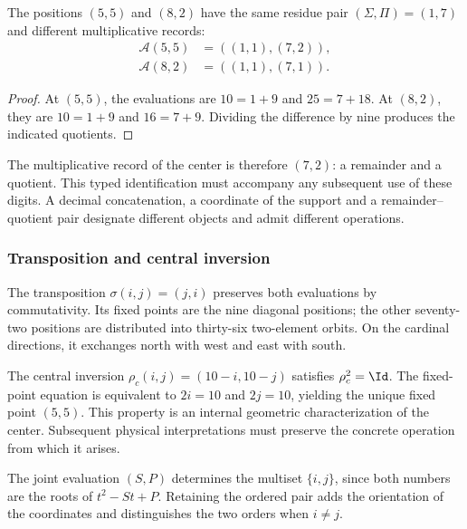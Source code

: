 



\begin{bloqueindivisible}
\begin{proposicion}
\label{prop:app-centro}
The positions $(5,5)$ and $(8,2)$ have the same residue pair $(\Sigma,\Pi)=(1,7)$ and different multiplicative records:
\begin{align}
 \mathcal A(5,5)&=((1,1),(7,2)),\\
 \mathcal A(8,2)&=((1,1),(7,1)).
\end{align}
\end{proposicion}

\begin{proof}
At $(5,5)$, the evaluations are $10=1+9$ and $25=7+18$. At $(8,2)$, they are $10=1+9$ and $16=7+9$. Dividing the difference by nine produces the indicated quotients.
\end{proof}
\end{bloqueindivisible}

The multiplicative record of the center is therefore $(7,2)$: a remainder and a quotient. This typed identification must accompany any subsequent use of these digits. A decimal concatenation, a coordinate of the support and a remainder--quotient pair designate different objects and admit different operations.

\subsubsection{Transposition and central inversion}

The transposition $\sigma(i,j)=(j,i)$ preserves both evaluations by commutativity. Its fixed points are the nine diagonal positions; the other seventy-two positions are distributed into thirty-six two-element orbits. On the cardinal directions, it exchanges north with west and east with south.

The central inversion $\rho_c(i,j)=(10-i,10-j)$ satisfies $\rho_c^2=\Id$. The fixed-point equation is equivalent to $2i=10$ and $2j=10$, yielding the unique fixed point $(5,5)$. This property is an internal geometric characterization of the center. Subsequent physical interpretations must preserve the concrete operation from which it arises.

The joint evaluation $(S,P)$ determines the multiset $\{i,j\}$, since both numbers are the roots of $t^2-St+P$. Retaining the ordered pair adds the orientation of the coordinates and distinguishes the two orders when $i\neq j$.

